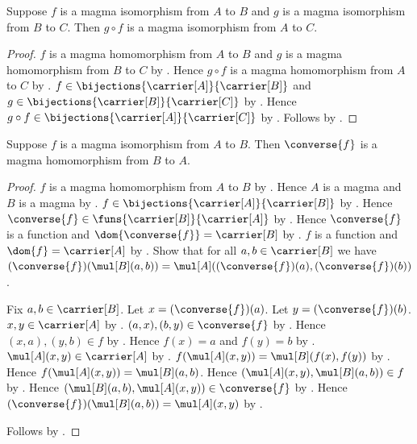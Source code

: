 \begin{theorem}\label{magma_isomorphism_composition}
    Suppose $f$ is a magma isomorphism from $A$ to $B$ and
        $g$ is a magma isomorphism from $B$ to $C$.
    Then $g\circ f$ is a magma isomorphism from $A$ to $C$.
\end{theorem}
\begin{proof}
    $f$ is a magma homomorphism from $A$ to $B$ and
        $g$ is a magma homomorphism from $B$ to $C$ by
        .
    Hence $g\circ f$ is a magma homomorphism from $A$ to $C$ by
        .
    $f\in\bijections{\carrier[A]}{\carrier[B]}$ and
        $g\in\bijections{\carrier[B]}{\carrier[C]}$ by
        .
    Hence $g\circ f\in\bijections{\carrier[A]}{\carrier[C]}$ by
        .
    Follows by .
\end{proof}

\begin{theorem}\label{magma_isomorphism_converse_hom}
    Suppose $f$ is a magma isomorphism from $A$ to $B$.
    Then $\converse{f}$ is a magma homomorphism from $B$ to $A$.
\end{theorem}
\begin{proof}
    $f$ is a magma homomorphism from $A$ to $B$ by
        .
    Hence $A$ is a magma and $B$ is a magma by
        .
    $f\in\bijections{\carrier[A]}{\carrier[B]}$ by
        .
    Hence $\converse{f}\in\funs{\carrier[B]}{\carrier[A]}$ by
        .
    Hence $\converse{f}$ is a function and
        $\dom{\converse{f}}=\carrier[B]$ by .
    $f$ is a function and $\dom{f}=\carrier[A]$ by
        .
    Show that for all $a,b\in\carrier[B]$ we have
        $(\converse{f})(\mul[B](a,b))=
            \mul[A]((\converse{f})(a),(\converse{f})(b))$.
    \begin{subproof}
        Fix $a,b\in\carrier[B]$.
        Let $x=(\converse{f})(a)$.
        Let $y=(\converse{f})(b)$.
        $x,y\in\carrier[A]$ by .
        $(a,x),(b,y)\in\converse{f}$ by
            .
        Hence $(x,a),(y,b)\in f$ by .
        Hence $f(x)=a$ and $f(y)=b$ by
            .
        $\mul[A](x,y)\in\carrier[A]$ by .
        $f(\mul[A](x,y))=\mul[B](f(x),f(y))$ by
            .
        Hence $f(\mul[A](x,y))=\mul[B](a,b)$.
        Hence $(\mul[A](x,y),\mul[B](a,b))\in f$ by
            .
        Hence $(\mul[B](a,b),\mul[A](x,y))\in\converse{f}$ by
            .
        Hence
            $(\converse{f})(\mul[B](a,b))=\mul[A](x,y)$ by
            .
    \end{subproof}
    Follows by .
\end{proof}

